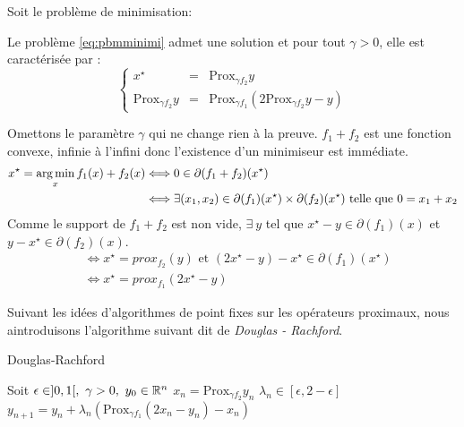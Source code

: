 \documentclass[a4paper,12pt]{article}
\newcommand{\prox}{\text{Prox}}
\begin{document}
 
Soit le problème de minimisation: \\


\begin{propriete}
Le problème \ref{eq:pbmminimi} admet une solution et pour tout $\gamma >0$, elle est caractérisée par :
$$
\left\{
\begin{array}{rcl}
x^{\star} &= & \prox_{\gamma f_2} y \\
\prox_{\gamma f_2}y &= & \prox_{\gamma f_1}(2\prox_{\gamma f_2}y -y)
\end{array}
\right.
$$
\end{propriete}

\begin{preuve}
Omettons le paramètre $\gamma$ qui ne change rien à la preuve. $f_1+f_2$ est une fonction convexe, infinie à l'infini donc l'existence d'un minimiseur est immédiate.
\begin{align*}
x^{\star} =\operatorname*{arg\,min}_x f_1(x) + f_2(x) &\Longleftrightarrow 0\in \partial (f_1+f_2)(x^{\star}) \\
&\Longleftrightarrow \exists (x_1,x_2)\in \partial(f_1)(x^{\star})\times\partial(f_2)(x^{\star}) \text{ telle que } 0=x_1+x_2
\end{align*}
Comme le support de $f_1+f_2$ est non vide, $\exists\ y$ tel que $x^{\star}-y\in \partial(f_1)(x)$ et $y-x^{\star}\in\partial(f_2)(x)$.
\begin{align*}
&\Longleftrightarrow x^{\star}=prox_{f_2} (y) \text{ et } (2x^{\star}-y)-x^{\star}\in\partial(f_1)(x^{\star})\\
&\Longleftrightarrow x^{\star} = prox_{f_1}(2x^{\star}-y)
\end{align*}
\end{preuve}

Suivant les idées d'algorithmes de point fixes sur les opérateurs proximaux, nous aintroduisons l'algorithme suivant dit de \emph{Douglas - Rachford}.
\begin{algorithm}
\caption{Douglas-Rachford}
\begin{algorithmic}
\STATE Soit $\epsilon \in ]0,1[,\ \gamma >0,\ y_0\in \RR^n$
\STATE $x_n = \prox_{\gamma f_2} y_n$
\STATE $\lambda_n \in [\epsilon,2-\epsilon]$
\STATE $y_{n+1} = y_n + \lambda_n(\prox_{\gamma f_1} (2x_n-y_n)-x_n)$
\ENDFOR
\end{algorithmic}
\end{algorithm}
\end{document}
